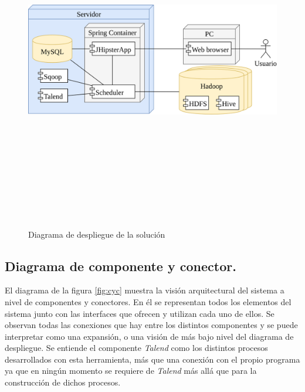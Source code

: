 \begin{figure}[H]
    \centering
    \includegraphics[width=1\textwidth,height=15cm,keepaspectratio]{Imagenes/despliegue}
    \caption{Diagrama de despliegue de la solución}
    \label{fig:despliegue}
\end{figure}

\subsection{Diagrama de componente y conector.} \label{disenyo.arquitectura.cyc}
\par El diagrama de la figura \ref{fig:cyc} muestra la visión arquitectural del sistema a nivel de componentes y conectores. En él se representan todos los elementos del sistema junto con las interfaces que ofrecen y utilizan cada uno de ellos. Se observan todas las conexiones que hay entre los distintos componentes y se puede interpretar como una expansión, o una visión de más bajo nivel del diagrama de despliegue. Se entiende el componente \textit{Talend} como los distintos procesos desarrollados con esta herramienta, más que una conexión con el propio programa ya que en ningún momento se requiere de \textit{Talend} más allá que para la construcción de dichos procesos. 

